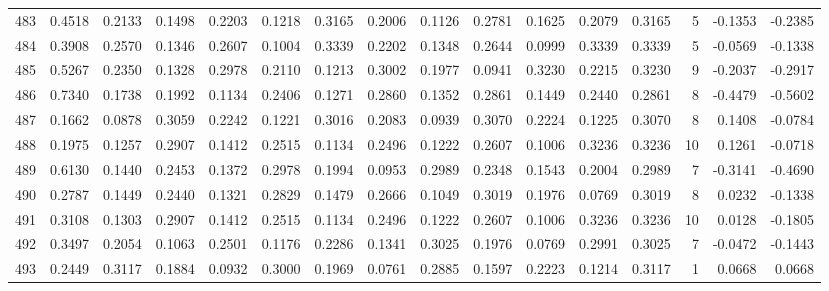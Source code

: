 \begin{tabular}{lrrrrrrrrrrrrrrr}
483 &      0.4518 &  0.2133 &  0.1498 &  0.2203 &  0.1218 &  0.3165 &  0.2006 &  0.1126 &  0.2781 &  0.1625 &   0.2079 &     0.3165 &      5 &                   -0.1353 &                    -0.2385 \\
484 &      0.3908 &  0.2570 &  0.1346 &  0.2607 &  0.1004 &  0.3339 &  0.2202 &  0.1348 &  0.2644 &  0.0999 &   0.3339 &     0.3339 &      5 &                   -0.0569 &                    -0.1338 \\
485 &      0.5267 &  0.2350 &  0.1328 &  0.2978 &  0.2110 &  0.1213 &  0.3002 &  0.1977 &  0.0941 &  0.3230 &   0.2215 &     0.3230 &      9 &                   -0.2037 &                    -0.2917 \\
486 &      0.7340 &  0.1738 &  0.1992 &  0.1134 &  0.2406 &  0.1271 &  0.2860 &  0.1352 &  0.2861 &  0.1449 &   0.2440 &     0.2861 &      8 &                   -0.4479 &                    -0.5602 \\
487 &      0.1662 &  0.0878 &  0.3059 &  0.2242 &  0.1221 &  0.3016 &  0.2083 &  0.0939 &  0.3070 &  0.2224 &   0.1225 &     0.3070 &      8 &                    0.1408 &                    -0.0784 \\
488 &      0.1975 &  0.1257 &  0.2907 &  0.1412 &  0.2515 &  0.1134 &  0.2496 &  0.1222 &  0.2607 &  0.1006 &   0.3236 &     0.3236 &     10 &                    0.1261 &                    -0.0718 \\
489 &      0.6130 &  0.1440 &  0.2453 &  0.1372 &  0.2978 &  0.1994 &  0.0953 &  0.2989 &  0.2348 &  0.1543 &   0.2004 &     0.2989 &      7 &                   -0.3141 &                    -0.4690 \\
490 &      0.2787 &  0.1449 &  0.2440 &  0.1321 &  0.2829 &  0.1479 &  0.2666 &  0.1049 &  0.3019 &  0.1976 &   0.0769 &     0.3019 &      8 &                    0.0232 &                    -0.1338 \\
491 &      0.3108 &  0.1303 &  0.2907 &  0.1412 &  0.2515 &  0.1134 &  0.2496 &  0.1222 &  0.2607 &  0.1006 &   0.3236 &     0.3236 &     10 &                    0.0128 &                    -0.1805 \\
492 &      0.3497 &  0.2054 &  0.1063 &  0.2501 &  0.1176 &  0.2286 &  0.1341 &  0.3025 &  0.1976 &  0.0769 &   0.2991 &     0.3025 &      7 &                   -0.0472 &                    -0.1443 \\
493 &      0.2449 &  0.3117 &  0.1884 &  0.0932 &  0.3000 &  0.1969 &  0.0761 &  0.2885 &  0.1597 &  0.2223 &   0.1214 &     0.3117 &      1 &                    0.0668 &                     0.0668 \\

\end{tabular}
